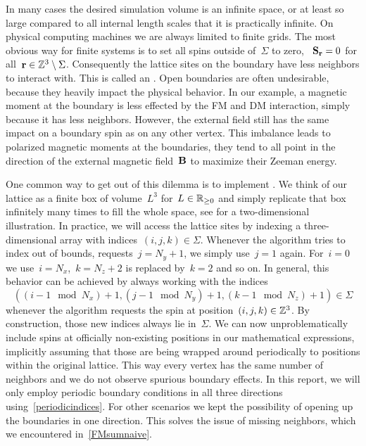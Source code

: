 In many cases the desired simulation volume is an infinite space, or at least so
large compared to all internal length scales that it is practically infinite. On
physical computing machines we are always limited to finite grids. The most
obvious way for finite systems is to set all spins outside of~$\Sigma$ to zero,
\ie{}~$\mathbf{S}_{\mathbf{r}} = 0$ for all~$\mathbf{r} \in \mathbb{Z}^3 \setminus \Sigma$. Consequently the
lattice sites on the boundary have less neighbors to interact with. This is
called an . Open boundaries are often undesirable,
because they heavily impact the physical behavior. In our example, a magnetic
moment at the boundary is less effected by the FM and DM interaction, simply
because it has less neighbors. However, the external field still has the same
impact on a boundary spin as on any other vertex. This imbalance leads to
polarized magnetic moments at the boundaries, \ie{} they tend to all point in
the direction of the external magnetic field~$\mathbf{B}$ to maximize their Zeeman
energy.

One common way to get out of this dilemma is to implement . We think of our lattice as a finite box of volume~$L^3$
for~$L\in \mathbb{R}_{\ge 0}$ and simply replicate that box infinitely many times to fill the
whole space, see  for a two-dimensional illustration. In
practice, we will access the lattice sites by indexing a three-dimensional array
with indices~$(i,j,k)\in\Sigma$. Whenever the algorithm tries to index out of
bounds, \eg{} requests~$j=N_y + 1$, we simply use~$j=1$ again. For~$i=0$ we
use~$i=N_x$,~$k=N_z+2$ is replaced by~$k=2$ and so on. In general, this behavior
can be achieved by always working with the indices
%
\begin{equation}\label{periodicindices}
  ((i-1 \mod N_x) + 1, (j-1 \mod N_y) + 1, (k-1 \mod N_z) + 1) \in \Sigma
\end{equation}
%
whenever the algorithm requests the spin at position~$(i,j,k) \in \mathbb{Z}^3$. By
construction, those new indices always lie in~$\Sigma$. We can now
unproblematically include spins at officially non-existing positions in our
mathematical expressions, implicitly assuming that those are being wrapped
around periodically to positions within the original lattice. This way every
vertex has the same number of neighbors and we do not observe spurious boundary
effects. In this report, we will only employ periodic boundary conditions in all
three directions using~\eqref{periodicindices}. For other scenarios we kept the
possibility of opening up the boundaries in one direction. This solves the issue
of missing neighbors, which we encountered in~\eqref{FMsumnaive}.


